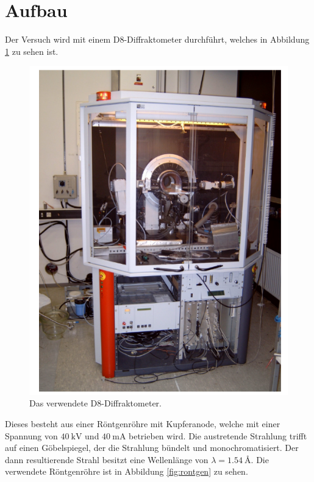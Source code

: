 \section{Aufbau}

Der Versuch wird mit einem D8-Diffraktometer durchführt, welches in Abbildung \ref{fig:aufbau} zu sehen ist. 

\begin{figure}
    \centering
    \includegraphics[scale=0.3]{content/D8.png}
    \caption{Das verwendete D8-Diffraktometer.\cite{Anleitung}}
    \label{fig:aufbau}
\end{figure} 

Dieses besteht aus einer Röntgenröhre mit Kupferanode, welche mit einer Spannung von $\SI{40}{\kilo\volt}$ und 
$\SI{40}{\milli\ampere}$ betrieben wird. Die austretende Strahlung trifft auf einen Göbelspiegel, der die Strahlung
bündelt und monochromatisiert. Der dann resultierende Strahl besitzt eine Wellenlänge von $\lambda = \SI{1.54}{\angstrom}$.
Die verwendete Röntgenröhre ist in Abbildung \ref{fig:rontgen} zu sehen. 


